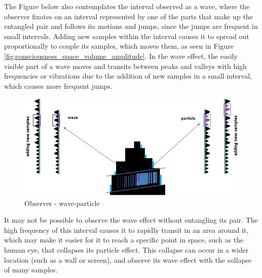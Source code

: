 The Figure below also contemplates the interval observed as a wave, where the observer fixates on an interval represented by one of the parts that make up the entangled pair and follows its motions and jumps, since the jumps are frequent in small intervals. Adding new samples within the interval causes it to spread out proportionally to couple its samples, which moves them, as seen in Figure \ref{fig:consciousness_space_volume_amplitude}. In the wave effect, the easily visible part of a wave moves and transits between peaks and valleys with high frequencies or vibrations due to the addition of new samples in a small interval, which causes more frequent jumps.
	\begin{figure}[H]
	\caption{Observer - wave-particle}
	\label{fig:consciousness_space_wave-particle}
	\centering
	\includegraphics[scale=.55]{sections/images/consciousness_space_wave-particle.jpg}
	\end{figure}

It may not be possible to observe the wave effect without entangling its pair. The high frequency of this interval causes it to rapidly transit in an area around it, which may make it easier for it to reach a specific point in space, such as the human eye, that collapses its particle effect. This collapse can occur in a wider location (such as a wall or screen), and observe its wave effect with the collapse of many samples.
